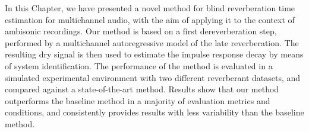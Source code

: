 In this Chapter, we have presented  a novel method for blind reverberation time estimation for multichannel audio, with the aim of applying it to the context of ambisonic recordings. Our method is based on a first dereverberation step,  performed by a multichannel autoregressive model of the late reverberation. The resulting dry signal is then used to estimate the impulse response decay by means of system identification. 
The performance of the method is evaluated in a simulated experimental environment with two different reverberant datasets, and compared against a state-of-the-art method. 
Results show that our method outperforms the baseline method in a majority of evaluation metrics and conditions, and consistently provides results with less variability than the baseline method. 
